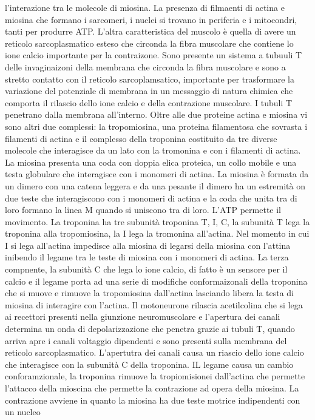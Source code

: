 l'interazione tra le molecole di miosina. La presenza di filmaenti di actina e miosina che formano i sarcomeri, i nuclei si trovano in periferia e i mitocondri, tanti per produrre ATP. 
L'altra caratteristica del muscolo \`e quella di avere un reticolo sarcoplasmatico esteso che circonda la fibra muscolare che contiene lo ione calcio importante per la contraizone. Sono
presente un sistema a tubuuli T delle invaginaizoni della membrana che circonda la fibra muscolare e sono a stretto contatto con il reticolo sarcoplamsatico, importante per trasformare 
la variazione del potenziale di membrana in un messaggio di natura chimica che comporta il rilascio dello ione calcio e della contrazione muscolare. I tubuli T penetrano dalla membrana 
all'interno. Oltre alle due proteine actina e miosina vi sono altri due complessi: la tropomiosina, una proteina filamentosa che sovrasta i filamenti di actina e il complesso della 
troponina costituito da tre diverse molecole che interagisce da un lato con la tromonina e con i filamenti di actina. La miosina presenta una coda con doppia elica proteica, un collo
mobile e una testa globulare che interagisce con i monomeri di actina. La miosina \`e formata da un dimero con una catena leggera e da una pesante il dimero ha un estremit\`a on due
teste che interagiscono con i monomeri di actina e la coda che unita tra di loro formano la linea M quando si uniscono tra di loro. L'ATP permette il movimento. La troponina ha
tre subunit\`a troponina T, I, C, la subunit\`a T lega la troponina alla tropomiosina, la I lega la tromonina all'actina. Nel momento in cui I si lega all'actina impedisce alla miosina 
di legarsi della miosina con l'attina inibendo il legame tra le teste di miosina con i monomeri di actina. La terza compnente, la subunit\`a C che lega lo ione calcio, di fatto \`e un
sensore per il calcio e il legame porta ad una serie di modifiche conformaizonali della troponina che si muove e rimuove la tropomiosina dall'actina lasciando libera la testa di miosina
di interagire con l'actina. Il motoneurone rilascia acetilcolina che si lega ai recettori presenti nella giunzione neuromuscolare e l'apertura dei canali determina un onda di
depolarizzazione che penetra grazie ai tubuli T, quando arriva apre i canali voltaggio dipendenti e sono presenti sulla membrana del reticolo sarcoplasmatico. L'apertutra dei canali 
causa un riascio dello ione calcio che interagisce con la subunit\`a C della troponina. IL legame causa un cambio conforamzionale, la troponina rimuove la tropiomisionei dall'actina
che permette l'attacco della mioscina che permette la contrazione ad opera della miosina. La contrazione avviene in quanto la miosina ha due teste motrice indipendenti con un nucleo 
